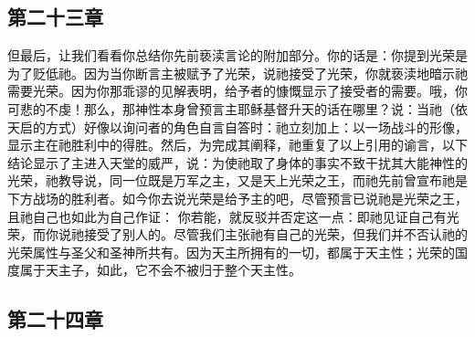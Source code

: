 
\subsection{第二十三章}

\par

但最后，让我们看看你总结你先前亵渎言论的附加部分。你的话是：你提到光荣是为了贬低祂。因为当你断言主被赋予了光荣，说祂接受了光荣，你就亵渎地暗示祂需要光荣。因为你那乖谬的见解表明，给予者的慷慨显示了接受者的需要。哦，你可悲的不虔！那么，那神性本身曾预言主耶稣基督升天的话在哪里？说：当祂（依天启的方式）好像以询问者的角色自言自答时：祂立刻加上：以一场战斗的形像，显示主在祂胜利中的得胜。然后，为完成其阐释，祂重复了以上引用的谕言，以下结论显示了主进入天堂的威严，说：为使祂取了身体的事实不致干扰其大能神性的光荣，祂教导说，同一位既是万军之主，又是天上光荣之王，而祂先前曾宣布祂是下方战场的胜利者。如今你去说光荣是给予主的吧，尽管预言已说祂是光荣之王，且祂自己也如此为自己作证： 你若能，就反驳并否定这一点：即祂见证自己有光荣，而你说祂接受了别人的。尽管我们主张祂有自己的光荣，但我们并不否认祂的光荣属性与圣父和圣神所共有。因为天主所拥有的一切，都属于天主性；光荣的国度属于天主子，如此，它不会不被归于整个天主性。\par


\subsection{第二十四章}

\par


